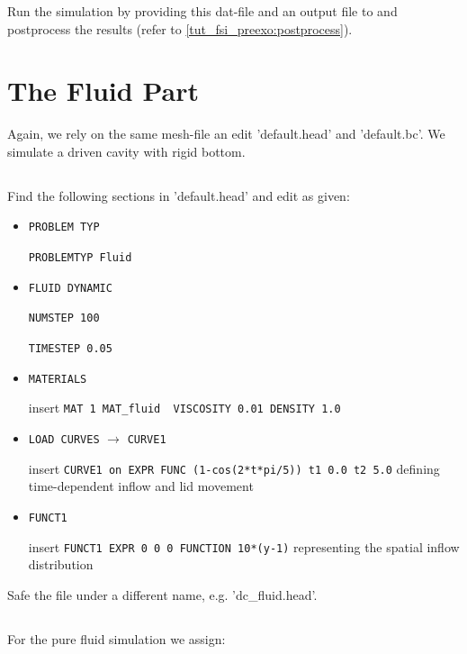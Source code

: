 Run the simulation by providing this dat-file and an output file to \baci{} and postprocess the results (refer to \ref{tut_fsi_preexo:postprocess}).

\section{The Fluid Part}
Again, we rely on the same mesh-file an edit 'default.head' and 'default.bc'. We simulate a driven cavity with rigid bottom.

\subsection{\head}
Find the following sections in 'default.head' and edit as given:

\begin{itemize}
 \item \verb|PROBLEM TYP|

 \verb|PROBLEMTYP Fluid|
 \item \verb|FLUID DYNAMIC|

 \verb|NUMSTEP 100|

 \verb|TIMESTEP 0.05|

 \item \verb|MATERIALS|

  insert \verb|MAT 1 MAT_fluid  VISCOSITY 0.01 DENSITY 1.0|

  \item \verb|LOAD CURVES| $\to$ \verb|CURVE1|

  insert \verb|CURVE1 on EXPR FUNC (1-cos(2*t*pi/5)) t1 0.0 t2 5.0| defining time-dependent inflow and lid movement
 
   \item \verb|FUNCT1|

  insert \verb|FUNCT1 EXPR 0 0 0 FUNCTION 10*(y-1)| representing the spatial inflow distribution

\end{itemize}
Safe the file under a different name, e.g. 'dc\_fluid.head'.

\subsection{\bc}
For the pure fluid simulation we assign:

